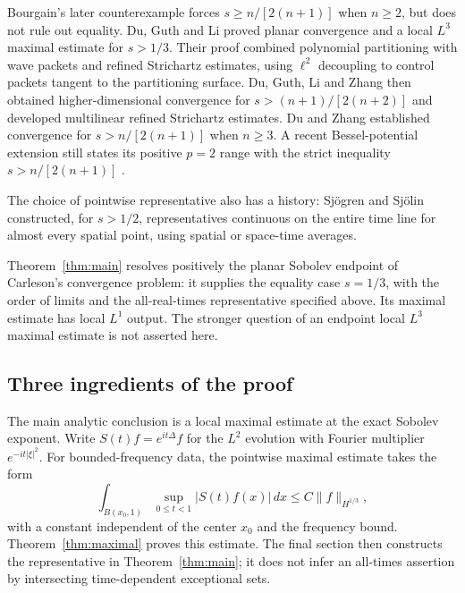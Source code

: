Bourgain's later counterexample \cite[Proposition~1]{Bourgain16} forces
$s\ge n/[2(n+1)]$ when $n\ge2$, but does not rule out equality.
Du, Guth and Li \cite[Theorems~1.1--1.2]{DGL17} proved planar convergence
and a local $L^3$ maximal estimate for $s>1/3$. Their proof combined
polynomial partitioning with wave packets and refined Strichartz
estimates, using $\ell^2$ decoupling to control packets tangent to the
partitioning surface. Du, Guth, Li and Zhang
\cite[Theorems~1.1 and~4.2]{DGLZ18} then obtained higher-dimensional
convergence for $s>(n+1)/[2(n+2)]$ and developed multilinear refined
Strichartz estimates. Du and Zhang \cite[Theorem~1.1]{DZ19} established
convergence for $s>n/[2(n+1)]$ when $n\ge3$. A recent Bessel-potential
extension still states its positive $p=2$ range with the strict
inequality $s>n/[2(n+1)]$
\cite[Theorems~1.3--1.4]{PanSunTan26}.

The choice of pointwise representative also has a history: Sj\"ogren and
Sj\"olin \cite[Theorem~2]{SjogrenSjolin89} constructed, for $s>1/2$,
representatives continuous on the entire time line for almost every
spatial point, using spatial or space-time averages.

Theorem~\ref{thm:main} resolves positively the planar Sobolev endpoint of
Carleson's convergence problem: it supplies the equality case $s=1/3$,
with the order of limits and the all-real-times representative specified
above. Its maximal estimate has local $L^1$ output. The stronger question
of an endpoint local $L^3$ maximal estimate is not asserted here.

\subsection{Three ingredients of the proof}
The main analytic conclusion is a local maximal estimate at the exact
Sobolev exponent. Write $S(t)f=e^{it\Delta}f$ for the $L^2$ evolution
with Fourier multiplier $e^{-it|\xi|^2}$. For bounded-frequency data,
the pointwise maximal estimate takes the form
\begin{equation}\label{eq:intro-maximal}
 \int_{B(x_0,1)}\sup_{0\le t<1}|S(t)f(x)|\,dx
       \le C\|f\|_{H^{1/3}},
\end{equation}
with a constant independent of the center $x_0$ and the frequency bound.
Theorem~\ref{thm:maximal} proves this estimate. The final section then
constructs the representative in Theorem~\ref{thm:main}; it does not infer
an all-times assertion by intersecting time-dependent exceptional sets.

